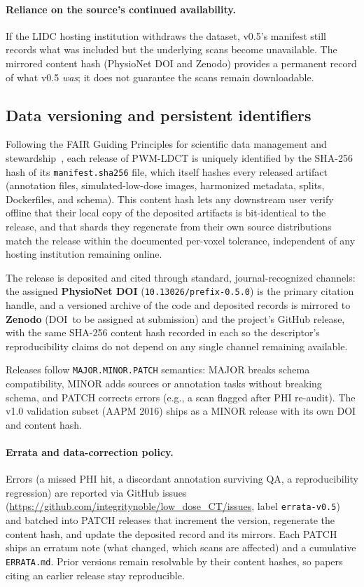 \documentclass[twoside,11pt]{article}
\begin{document}
\paragraph{Reliance on the source's continued availability.} If the LIDC hosting institution withdraws the dataset, v0.5's manifest still records what was included but the underlying scans become unavailable. The mirrored content hash (PhysioNet DOI and Zenodo) provides a permanent record of what v0.5 \textit{was}; it does not guarantee the scans remain downloadable.

\subsection*{Data versioning and persistent identifiers}

Following the FAIR Guiding Principles for scientific data management and stewardship~\citep{wilkinson2016fair}, each release of PWM-LDCT is uniquely identified by the SHA-256 hash of its \texttt{manifest.sha256} file, which itself hashes every released artifact (annotation files, simulated-low-dose images, harmonized metadata, splits, Dockerfiles, and schema). This content hash lets any downstream user verify offline that their local copy of the deposited artifacts is bit-identical to the release, and that shards they regenerate from their own source distributions match the release within the documented per-voxel tolerance, independent of any hosting institution remaining online.

The release is deposited and cited through standard, journal-recognized channels: the assigned \textbf{PhysioNet DOI} (\texttt{10.13026/prefix-0.5.0}) is the primary citation handle, and a versioned archive of the code and deposited records is mirrored to \textbf{Zenodo} (DOI~to be assigned at submission) and the project's GitHub release, with the same SHA-256 content hash recorded in each so the descriptor's reproducibility claims do not depend on any single channel remaining available.

Releases follow \texttt{MAJOR.MINOR.PATCH} semantics: MAJOR breaks schema compatibility, MINOR adds sources or annotation tasks without breaking schema, and PATCH corrects errors (e.g., a scan flagged after PHI re-audit). The v1.0 validation subset (AAPM 2016) ships as a MINOR release with its own DOI and content hash.

\paragraph{Errata and data-correction policy.} Errors (a missed PHI hit, a discordant annotation surviving QA, a reproducibility regression) are reported via GitHub issues (\url{https://github.com/integritynoble/low_dose_CT/issues}, label \texttt{errata-v0.5}) and batched into PATCH releases that increment the version, regenerate the content hash, and update the deposited record and its mirrors. Each PATCH ships an erratum note (what changed, which scans are affected) and a cumulative \texttt{ERRATA.md}. Prior versions remain resolvable by their content hashes, so papers citing an earlier release stay reproducible.
\end{document}
